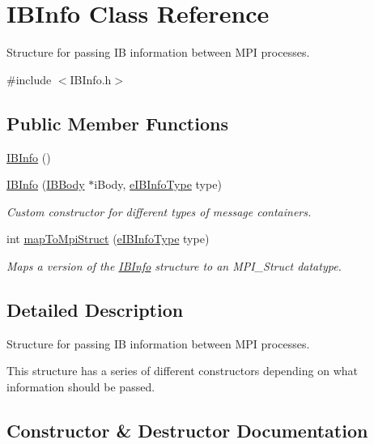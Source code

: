 \hypertarget{class_i_b_info}{}\section{I\+B\+Info Class Reference}
\label{class_i_b_info}


Structure for passing IB information between M\+PI processes.  




{\ttfamily \#include $<$I\+B\+Info.\+h$>$}

\subsection*{Public Member Functions}
\begin{DoxyCompactItemize}
\item 
\hyperlink{class_i_b_info_ab1b7ff9861d5920fdb50cbcc7c8154a7}{I\+B\+Info} ()
\item 
\hyperlink{class_i_b_info_ab0c04478c166732f951433f0f654028b}{I\+B\+Info} (\hyperlink{class_i_b_body}{I\+B\+Body} $\ast$i\+Body, \hyperlink{_enumerations_8h_abebe7da22c3d9c15fff1438f5a452002}{e\+I\+B\+Info\+Type} type)
\begin{DoxyCompactList}\small\item\em Custom constructor for different types of message containers. \end{DoxyCompactList}\item 
int \hyperlink{class_i_b_info_a8a69bdc7f68d65f04bc1d943c1bc802d}{map\+To\+Mpi\+Struct} (\hyperlink{_enumerations_8h_abebe7da22c3d9c15fff1438f5a452002}{e\+I\+B\+Info\+Type} type)
\begin{DoxyCompactList}\small\item\em Maps a version of the \hyperlink{class_i_b_info}{I\+B\+Info} structure to an M\+P\+I\+\_\+\+Struct datatype. \end{DoxyCompactList}\end{DoxyCompactItemize}


\subsection{Detailed Description}
Structure for passing IB information between M\+PI processes. 

This structure has a series of different constructors depending on what information should be passed. 

\subsection{Constructor \& Destructor Documentation}
